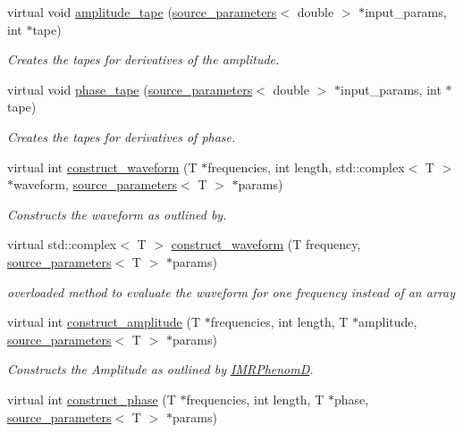 \begin{DoxyCompactItemize}
virtual void \hyperlink{classIMRPhenomD_a6fbe3c51ee3eb66d332dc87a9fdf5bd4}{amplitude\+\_\+tape} (\hyperlink{structsource__parameters}{source\+\_\+parameters}$<$ double $>$ $\ast$input\+\_\+params, int $\ast$tape)
\begin{DoxyCompactList}\small\item\em Creates the tapes for derivatives of the amplitude. \end{DoxyCompactList}\item 
virtual void \hyperlink{classIMRPhenomD_ae456c25f87c34487e6e05f9cf5d2d08c}{phase\+\_\+tape} (\hyperlink{structsource__parameters}{source\+\_\+parameters}$<$ double $>$ $\ast$input\+\_\+params, int $\ast$tape)
\begin{DoxyCompactList}\small\item\em Creates the tapes for derivatives of phase. \end{DoxyCompactList}\item 
virtual int \hyperlink{classIMRPhenomD_aa7192bf99437b49e0b4f27a342a79dae}{construct\+\_\+waveform} (T $\ast$frequencies, int length, std\+::complex$<$ T $>$ $\ast$waveform, \hyperlink{structsource__parameters}{source\+\_\+parameters}$<$ T $>$ $\ast$params)
\begin{DoxyCompactList}\small\item\em Constructs the waveform as outlined by. \end{DoxyCompactList}\item 
virtual std\+::complex$<$ T $>$ \hyperlink{classIMRPhenomD_a1c15236140d34ea2ae1d9a540af7bdab}{construct\+\_\+waveform} (T frequency, \hyperlink{structsource__parameters}{source\+\_\+parameters}$<$ T $>$ $\ast$params)
\begin{DoxyCompactList}\small\item\em overloaded method to evaluate the waveform for one frequency instead of an array \end{DoxyCompactList}\item 
virtual int \hyperlink{classIMRPhenomD_a95e7946061fa24fdb7a770dba02147be}{construct\+\_\+amplitude} (T $\ast$frequencies, int length, T $\ast$amplitude, \hyperlink{structsource__parameters}{source\+\_\+parameters}$<$ T $>$ $\ast$params)
\begin{DoxyCompactList}\small\item\em Constructs the Amplitude as outlined by \hyperlink{classIMRPhenomD}{I\+M\+R\+PhenomD}. \end{DoxyCompactList}\item 
virtual int \hyperlink{classIMRPhenomD_abcbaafd0dc4086d2abe1f5ce256908c2}{construct\+\_\+phase} (T $\ast$frequencies, int length, T $\ast$phase, \hyperlink{structsource__parameters}{source\+\_\+parameters}$<$ T $>$ $\ast$params)

\end{DoxyCompactItemize}
